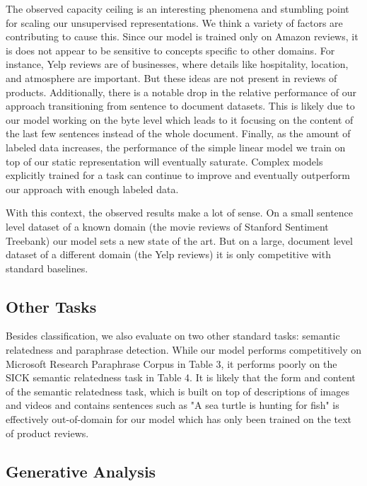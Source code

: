 The observed capacity ceiling is an interesting phenomena and stumbling point for scaling our unsupervised representations. We think a variety of factors are contributing to cause this. Since our model is trained only on Amazon reviews, it is does not appear to be sensitive to concepts specific to other domains. For instance, Yelp reviews are of businesses, where details like hospitality, location, and atmosphere are important. But these ideas are not present in reviews of products. Additionally, there is a notable drop in the relative performance of our approach transitioning from sentence to document datasets. This is likely due to our model working on the byte level which leads to it focusing on the content of the last few sentences instead of the whole document. Finally, as the amount of labeled data increases, the performance of the simple linear model we train on top of our static representation will eventually saturate. Complex models explicitly trained for a task can continue to improve and eventually outperform our approach with enough labeled data.

With this context, the observed results make a lot of sense. On a small sentence level dataset of a known domain (the movie reviews of Stanford Sentiment Treebank) our model sets a new state of the art. But on a large, document level dataset of a different domain (the Yelp reviews) it is only competitive with standard baselines.

\subsection{Other Tasks}

Besides classification, we also evaluate on two other standard tasks: semantic relatedness and paraphrase detection. While our model performs competitively on Microsoft Research Paraphrase Corpus \cite{dolan2004unsupervised} in Table 3, it performs poorly on the SICK semantic relatedness task \cite{marelli2014semeval} in Table 4. It is likely that the form and content of the semantic relatedness task, which is built on top of descriptions of images and videos and contains sentences such as "A sea turtle is hunting for fish" is effectively out-of-domain for our model which has only been trained on the text of product reviews.

\subsection{Generative Analysis}

